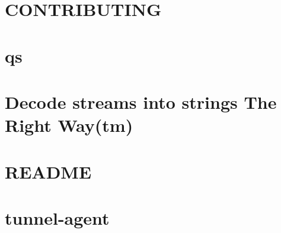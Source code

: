 \documentclass[twoside]{book}
\newcommand{\+}{\discretionary{\mbox{\scriptsize$\hookleftarrow$}}{}{}}
\begin{document}
\chapter{C\+O\+N\+T\+R\+I\+B\+U\+T\+I\+N\+G}
\label{md__c_1__users_martin__documents__git_hub_visual_studio__bachelor__wis_r__wis_r_node_modules_grud858fec1ab316c9b28fa3ead95c06c9a}
\hypertarget{md__c_1__users_martin__documents__git_hub_visual_studio__bachelor__wis_r__wis_r_node_modules_grud858fec1ab316c9b28fa3ead95c06c9a}{}

\chapter{qs}
\label{md__c_1__users_martin__documents__git_hub_visual_studio__bachelor__wis_r__wis_r_node_modules_gru918db77f5326d3d2efeed32483264901}
\hypertarget{md__c_1__users_martin__documents__git_hub_visual_studio__bachelor__wis_r__wis_r_node_modules_gru918db77f5326d3d2efeed32483264901}{}

\chapter{Decode streams into strings The Right Way(tm)}
\label{md__c_1__users_martin__documents__git_hub_visual_studio__bachelor__wis_r__wis_r_node_modules_grue2ed8beb77097a536fdd6796dfc854ce}
\hypertarget{md__c_1__users_martin__documents__git_hub_visual_studio__bachelor__wis_r__wis_r_node_modules_grue2ed8beb77097a536fdd6796dfc854ce}{}

\chapter{R\+E\+A\+D\+M\+E}
\label{md__c_1__users_martin__documents__git_hub_visual_studio__bachelor__wis_r__wis_r_node_modules_gru5c612dd3515f2849ca08680a0806ee37}
\hypertarget{md__c_1__users_martin__documents__git_hub_visual_studio__bachelor__wis_r__wis_r_node_modules_gru5c612dd3515f2849ca08680a0806ee37}{}

\chapter{tunnel-\/agent}
\label{md__c_1__users_martin__documents__git_hub_visual_studio__bachelor__wis_r__wis_r_node_modules_gru87eac0bc1d4717251a2f04f6c867f2bc}
\hypertarget{md__c_1__users_martin__documents__git_hub_visual_studio__bachelor__wis_r__wis_r_node_modules_gru87eac0bc1d4717251a2f04f6c867f2bc}{}

\end{document}
